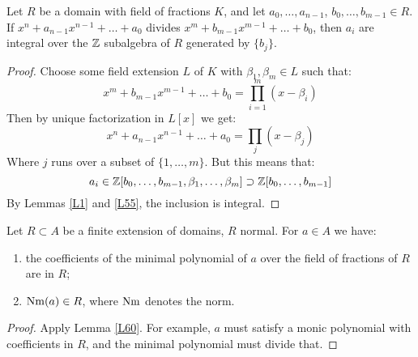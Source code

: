 \documentclass{../mathnotes}
\begin{document}
\begin{lem}
\label{L60}
Let $R$ be a domain with field of fractions $K$, and let $a_0, \dots, a_{n-1}$, $b_0, \dots, b_{m-1} \in R$. If $x^n + a_{n-1} x^{n-1} + \dots + a_0$ divides $x^m + b_{m-1} x^{m-1} + \dots + b_0$, then $a_i$ are integral over the $\mathbb{Z}$ subalgebra of $R$ generated by $\{b_j\}$.
\end{lem}
\begin{proof}
Choose some field extension $L$ of $K$ with $\beta_1, \beta_m \in L$ such that:
\[   x^m + b_{m-1}x^{m-1} + \dots + b_0 = \prod_{i=1}^m (x - \beta_i)  \]
Then by unique factorization in $L[x]$ we get:
\[     x^n + a_{n-1}x^{n-1} + \dots + a_0 = \prod_{j} (x - \beta_j)       \]
Where $j$ runs over a subset of $\{1, \dots, m\}$. But this means that:
\[     a_i \in \mathbb{Z}[b_0, \dots, b_{m-1} , \beta_1, \dots, \beta_m] \supset \mathbb{Z}[b_0, \dots, b_{m-1}]     \]
By Lemmas \ref{L1} and \ref{L55}, the inclusion is integral.
\end{proof}

\begin{lem}
\label{L61}
Let $R\subset A$ be a finite extension of domains, $R$ normal. For $a\in A$ we have:
\begin{enumerate} [(1)]
\item the coefficients of the minimal polynomial of $a$ over the field of fractions of $R$ are in $R$;
\item $\operatorname{Nm} (a) \in R$, where $\operatorname{Nm}$ denotes the norm.
\end{enumerate}
\end{lem}
\begin{proof}
Apply Lemma \ref{L60}. For example, $a$ must satisfy a monic polynomial with coefficients in $R$, and the minimal polynomial must divide that.
\end{proof}
\end{document}

